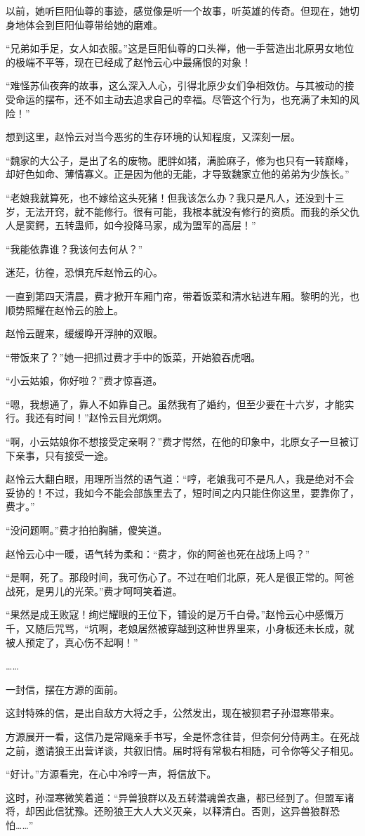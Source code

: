 \begin{this_body}
以前，她听巨阳仙尊的事迹，感觉像是听一个故事，听英雄的传奇。但现在，她切身地体会到巨阳仙尊带给她的磨难。

“兄弟如手足，女人如衣服。”这是巨阳仙尊的口头禅，他一手营造出北原男女地位的极端不平等，现在已经成了赵怜云心中最痛恨的对象！

“难怪苏仙夜奔的故事，这么深入人心，引得北原少女们争相效仿。与其被动的接受命运的摆布，还不如主动去追求自己的幸福。尽管这个行为，也充满了未知的风险！”

想到这里，赵怜云对当今恶劣的生存环境的认知程度，又深刻一层。

“魏家的大公子，是出了名的废物。肥胖如猪，满脸麻子，修为也只有一转巅峰，却好色如命、薄情寡义。正是因为他的无能，才导致魏家立他的弟弟为少族长。”

“老娘我就算死，也不嫁给这头死猪！但我该怎么办？我只是凡人，还没到十三岁，无法开窍，就不能修行。很有可能，我根本就没有修行的资质。而我的杀父仇人是窦鳄，五转蛊师，如今投降马家，成为盟军的高层！”

“我能依靠谁？我该何去何从？”

迷茫，彷徨，恐惧充斥赵怜云的心。

一直到第四天清晨，费才掀开车厢门帘，带着饭菜和清水钻进车厢。黎明的光，也顺势照耀在赵怜云的脸上。

赵怜云醒来，缓缓睁开浮肿的双眼。

“带饭来了？”她一把抓过费才手中的饭菜，开始狼吞虎咽。

“小云姑娘，你好啦？”费才惊喜道。

“嗯，我想通了，靠人不如靠自己。虽然我有了婚约，但至少要在十六岁，才能实行。我还有时间！”赵怜云目光炯炯。

“啊，小云姑娘你不想接受定亲啊？”费才愕然，在他的印象中，北原女子一旦被订下亲事，只有接受一途。

赵怜云大翻白眼，用理所当然的语气道：“哼，老娘我可不是凡人，我是绝对不会妥协的！不过，我如今不能会部族里去了，短时间之内只能住你这里，要靠你了，费才。”

“没问题啊。”费才拍拍胸脯，傻笑道。

赵怜云心中一暖，语气转为柔和：“费才，你的阿爸也死在战场上吗？”

“是啊，死了。那段时间，我可伤心了。不过在咱们北原，死人是很正常的。阿爸战死，是男儿的光荣。”费才呵呵笑着道。

“果然是成王败寇！绚烂耀眼的王位下，铺设的是万千白骨。”赵怜云心中感慨万千，又随后咒骂，“坑啊，老娘居然被穿越到这种世界里来，小身板还未长成，就被人预定了，真心伤不起啊！”

……

一封信，摆在方源的面前。

这封特殊的信，是出自敌方大将之手，公然发出，现在被狈君子孙湿寒带来。

方源展开一看，这信乃是常飚亲手书写，全是怀念往昔，但奈何分侍两主。在死战之前，邀请狼王出营详谈，共叙旧情。届时将有常极右相随，可令你等父子相见。

“好计。”方源看完，在心中冷哼一声，将信放下。

这时，孙湿寒微笑着道：“异兽狼群以及五转潜魂兽衣蛊，都已经到了。但盟军诸将，却因此信犹豫。还盼狼王大人大义灭亲，以释清白。否则，这异兽狼群恐怕……”

\end{this_body}

